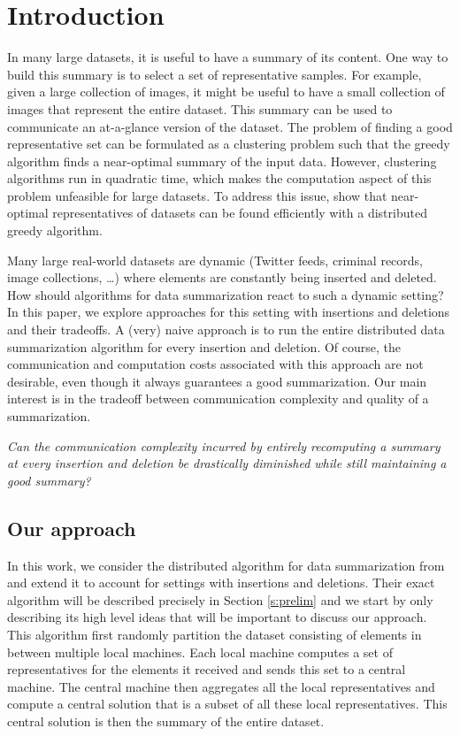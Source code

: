 \section{Introduction}

In many large datasets, it is useful to have a summary of its content. One way to build this summary is to select a set of representative samples. For example, given a large collection of images, it might be useful to have a small collection of images that represent the entire dataset. This summary can be used to communicate an at-a-glance version of the dataset. The problem of finding a good representative set can be formulated as a clustering problem such that the greedy algorithm finds a near-optimal summary of the input data. However, clustering algorithms run in quadratic time, which makes the computation aspect of this problem unfeasible for large datasets. To address this issue, \citet{mirzasoleiman2013distributed} show that near-optimal representatives of datasets can be found efficiently with a distributed greedy algorithm. 

Many large real-world datasets are dynamic (Twitter feeds, criminal records, image collections, \ldots) where elements are constantly being inserted and deleted. How should algorithms for data summarization react to such a dynamic setting? In this paper, we explore approaches for this setting with insertions and deletions and their tradeoffs. A (very) naive approach is to run the entire distributed data summarization algorithm for every insertion and deletion. Of course, the communication and computation costs associated with this approach are not desirable, even though it always guarantees a good summarization. Our main interest is in the tradeoff between communication complexity and quality of a summarization. 

\begin{center}
\textit{Can the communication complexity incurred by entirely recomputing a summary at every insertion and deletion be drastically diminished while still maintaining a good summary?}
\end{center}

	
	
	\subsection{Our approach}
	
	In this work, we consider the distributed algorithm for data summarization from \citet{mirzasoleiman2013distributed} and extend it to account for settings with insertions and deletions. Their exact algorithm will be described precisely in Section \ref{s:prelim} and we start by only describing its high level ideas that will be important to discuss our approach. This algorithm first randomly partition the dataset consisting of elements in between multiple local machines. Each local machine computes a set of representatives for the elements it received and sends this set to a central machine. The central machine then aggregates all the local representatives and compute a central solution that is a subset of all these local representatives. This central solution is then the summary of the entire dataset.
	
